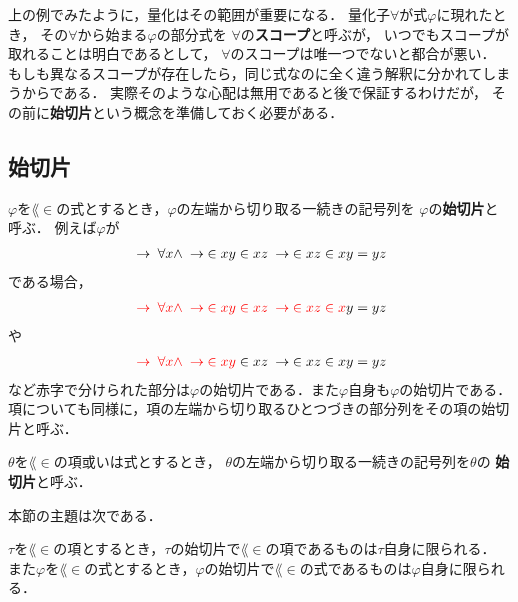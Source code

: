	上の例でみたように，量化はその範囲が重要になる．
	量化子$\forall$が式$\varphi$に現れたとき，
	その$\forall$から始まる$\varphi$の部分式を
	$\forall$の{\bf スコープ}と呼ぶが，
	いつでもスコープが取れることは明白であるとして，
	$\forall$のスコープは唯一つでないと都合が悪い．
	もしも異なるスコープが存在したら，同じ式なのに全く違う解釈に分かれてしまうからである．
	実際そのような心配は無用であると後で保証するわけだが，
	その前に{\bf 始切片}という概念を準備しておく必要がある．
	
\subsection{始切片}
	$\varphi$を$\lang{\in}$の式とするとき，$\varphi$の左端から切り取る一続きの記号列を
	$\varphi$の{\bf 始切片}と呼ぶ．
	例えば$\varphi$が
	\begin{align}
		\hspace{0.25em}\rightarrow\hspace{0.25em} \forall x \wedge \hspace{0.25em}\rightarrow\hspace{0.25em} \in xy \in xz \hspace{0.25em}\rightarrow\hspace{0.25em} \in xz \in xy = yz
	\end{align}
	である場合，
	\begin{align}
		\textcolor{red}{\hspace{0.25em}\rightarrow\hspace{0.25em} \forall x \wedge \hspace{0.25em}\rightarrow\hspace{0.25em} \in xy \in xz \hspace{0.25em}\rightarrow\hspace{0.25em} \in xz \in x}y = yz
	\end{align}
	や
	\begin{align}
		\textcolor{red}{\hspace{0.25em}\rightarrow\hspace{0.25em} \forall x \wedge \hspace{0.25em}\rightarrow\hspace{0.25em} \in xy} \in xz \hspace{0.25em}\rightarrow\hspace{0.25em} \in xz \in xy = yz
	\end{align}
	など赤字で分けられた部分は$\varphi$の始切片である．また$\varphi$自身も$\varphi$の始切片である．
	項についても同様に，項の左端から切り取るひとつづきの部分列をその項の始切片と呼ぶ．
	
	\begin{screen}
		\begin{metadfn}
		\label{metadfn:L_in_initial_segment}
			$\theta$を$\lang{\in}$の項或いは式とするとき，
			$\theta$の左端から切り取る一続きの記号列を$\theta$の
			{\bf 始切片}と呼ぶ．
		\end{metadfn}
	\end{screen}
	
	本節の主題は次である．
	\begin{screen}
		\begin{metathm}[始切片の一意性]\label{metathm:initial_segment_L_in}
			$\tau$を$\lang{\in}$の項とするとき，$\tau$の始切片で$\lang{\in}$の項であるものは$\tau$自身に限られる．
			また$\varphi$を$\lang{\in}$の式とするとき，$\varphi$の始切片で$\lang{\in}$の式であるものは$\varphi$自身に限られる．
		\end{metathm}
	\end{screen}
	
